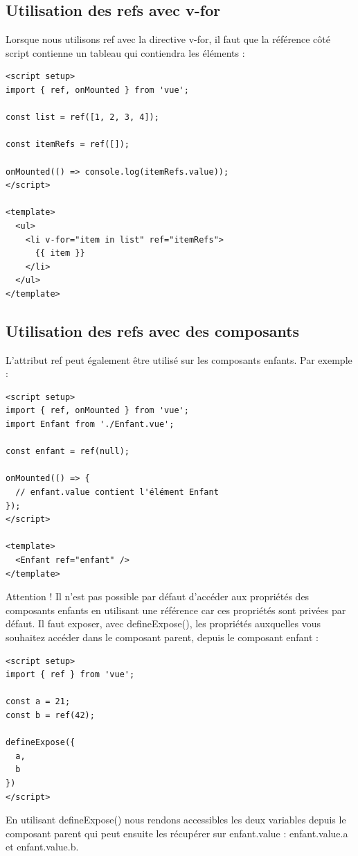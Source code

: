 \subsection{Utilisation des {\color{monOrange}refs} avec {\color{monOrange}v-for}}
Lorsque nous utilisons {\color{monOrange}ref} avec la directive {\color{monOrange}v-for}, il faut que la référence côté {\color{monOrange}script} contienne un tableau qui contiendra les éléments :
\begin{verbatim}
<script setup>
import { ref, onMounted } from 'vue';

const list = ref([1, 2, 3, 4]);

const itemRefs = ref([]);

onMounted(() => console.log(itemRefs.value));
</script>

<template>
  <ul>
    <li v-for="item in list" ref="itemRefs">
      {{ item }}
    </li>
  </ul>
</template>
\end{verbatim}

\subsection{Utilisation des {\color{monOrange}refs} avec des composants}
L'attribut {\color{monOrange}ref} peut également être utilisé sur les composants enfants. Par exemple :
\begin{verbatim}
<script setup>
import { ref, onMounted } from 'vue';
import Enfant from './Enfant.vue';

const enfant = ref(null);

onMounted(() => {
  // enfant.value contient l'élément Enfant
});
</script>

<template>
  <Enfant ref="enfant" />
</template>
\end{verbatim}
Attention ! Il n'est pas possible par défaut d'accéder aux propriétés des composants enfants en utilisant une référence car ces propriétés sont privées par défaut. Il faut exposer, avec {\color{monOrange}defineExpose()}, les propriétés auxquelles vous souhaitez accéder dans le composant parent, depuis le composant enfant :
\begin{verbatim}
<script setup>
import { ref } from 'vue';

const a = 21;
const b = ref(42);

defineExpose({
  a,
  b
})
</script>
\end{verbatim}
En utilisant {\color{monOrange}defineExpose()} nous rendons accessibles les deux variables depuis le composant parent qui peut ensuite les récupérer sur {\color{monOrange}enfant.value : enfant.value.a et enfant.value.b}.

